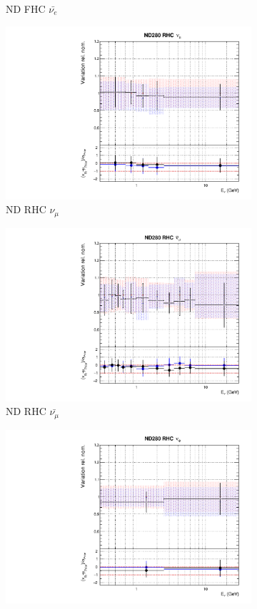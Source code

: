 \begin{figure}[t]
\begin{subfigure}{0.45\textwidth}
  \caption{ND FHC $\bar{\nu_{e}}$}
\end{subfigure}
\begin{subfigure}{0.45\textwidth}
  \centering
  \includegraphics[width=0.75\linewidth]{figs/rhcmpasmvflux4}
  \caption{ND RHC $\nu_{\mu}$}
\end{subfigure}
\begin{subfigure}{0.45\textwidth}
  \centering
  \includegraphics[width=0.75\linewidth]{figs/rhcmpasmvflux5}
  \caption{ND RHC $\bar{\nu_{\mu}}$}
\end{subfigure}
\begin{subfigure}{0.45\textwidth}
  \centering
  \includegraphics[width=0.75\linewidth]{figs/rhcmpasmvflux6}

\end{subfigure}
\end{figure}
